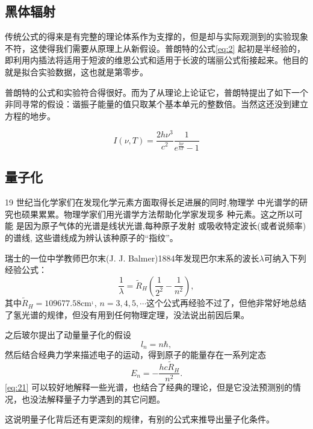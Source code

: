 \documentclass[12pt]{article}
\begin{document}
\subsection{黑体辐射}

传统公式的得来是有完整的理论体系作为支撑的，但是却与实际观测到的实验现象不符，这使得我们需要从原理上从新假设。普朗特的公式\cref{eq:2} 起初是半经验的，即利用内插法将适用于短波的维恩公式和适用于长波的瑞丽公式衔接起来。他目的就是拟合实验数据，这也就是第零步。

普朗特的公式和实验符合得很好。而为了从理论上论证它，普朗特提出了如下一个非同寻常的假设：谐振子能量的值只取某个基本单元的整数倍。当然这还没到建立方程的地步。

\begin{equation}
	I(\nu, T)=\frac{2 h \nu^3}{c^2} \frac{1}{e^{\frac{h \nu}{kT}}-1}
	\label{eq:2}
\end{equation}

\subsection{量子化}

19 世纪当化学家们在发现化学元素方面取得长足进展的同时,物理学 中光谱学的研究也硕果累累。物理学家们用光谱学方法帮助化学家发现多 种元素。这之所以可能 是因为原子气体的光谱是线状光谱,每种原子发射 或吸收特定波长(或者说频率)的谱线, 这些谱线成为辨认该种原子的“指纹”。

瑞士的一位中学教师巴尔末(J. J. Balmer)1884年发现巴尔末系的波长$\lambda$可纳入下列经验公式：
\begin{equation}
	\frac{1}{\lambda} = \widetilde{R}_H \left(\frac{1}{2^2}-\frac{1}{n^2}\right),
	\label{eq:20}
\end{equation}
其中$\widetilde{R}_H=109677.58$cm$^{_1}$, $n=3,4,5,\cdots$这个公式再经验不过了，但他非常好地总结了氢光谱的规律，但没有用到任何物理定理，没法说出前因后果。

之后玻尔提出了动量量子化的假设
\begin{equation}
	l_n=n\hbar,
	\label{eq:21}
\end{equation}
然后结合经典力学来描述电子的运动，得到原子的能量存在一系列定态
\begin{equation}
	E_n = - \frac{hc\widetilde{R}_H}{n^2}.
\end{equation}
\cref{eq:21} 可以较好地解释一些光谱，也结合了经典的理论，但是它没法预测别的情况，也没法解释量子力学遇到的其它问题。

这说明量子化背后还有更深刻的规律，有别的公式来推导出量子化条件。
\end{document}
